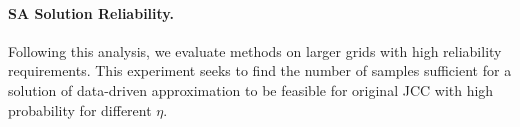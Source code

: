 \paragraph{ SA Solution Reliability.}
\begin{table}[t]
    \centering
    \caption{The number of samples for AR-SA and SA required in CC-OPF with a confidence threshold of $1-\eta$ to get the empirical reliability of $1-\hat{\rho} = 0.99$. The value of $1-\eta$ is given by out-of-sample Monte Carlo; the empirical reliability is given by averaging over $L=100$ independent CC-OPF problem instances, as described in Algorithm~\ref{alg:estimate_delta}. 
    }
    \label{tab:summary_results}
\end{table}
Following this analysis, we evaluate methods on larger grids with high reliability requirements. %
This experiment seeks to find the number of samples sufficient for a solution of data-driven approximation to be feasible for original JCC with high probability for different $\eta$.
